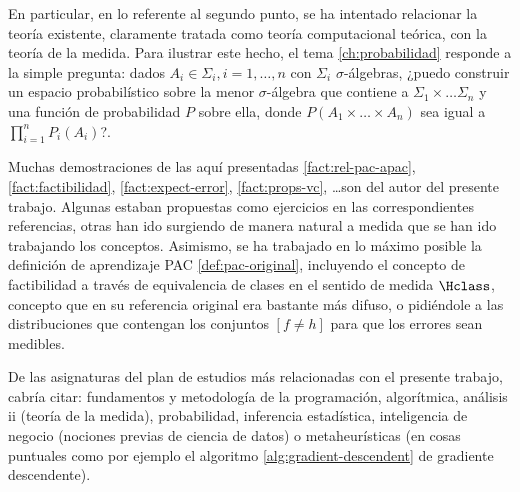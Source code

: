 En particular, en lo referente al segundo punto, se ha intentado relacionar la teoría existente, claramente tratada como 
teoría computacional teórica, con la teoría de la medida. Para ilustrar este hecho, el tema \ref{ch:probabilidad} responde a la 
simple pregunta: dados $A_i \in \Sigma_i, i=1, \ldots, n$ con $\Sigma_i$ $\sigma$-álgebras, ¿puedo construir un espacio probabilístico
sobre la menor $\sigma$-álgebra que contiene a $\Sigma_1 \times \ldots \Sigma_n$ y una función de probabilidad $P$ sobre ella,
donde $P(A_1 \times \ldots \times A_n)$ sea igual a $\prod_{i=1}^n P_i(A_i)$?. 

Muchas demostraciones de las aquí presentadas \ref{fact:rel-pac-apac}, \ref{fact:factibilidad}, \ref{fact:expect-error},
\ref{fact:props-vc}, \ldots son del autor del presente trabajo. Algunas estaban propuestas como ejercicios en las
correspondientes referencias, otras han ido surgiendo de manera natural a medida que se han ido trabajando los conceptos. 
Asimismo, se ha trabajado en lo máximo posible la definición de aprendizaje PAC \ref{def:pac-original},
incluyendo el concepto de factibilidad a través de equivalencia de clases en el sentido de medida $\Hclass$, concepto que en su
referencia original era bastante más difuso, o pidiéndole a las distribuciones que contengan los conjuntos $[f\neq h]$ para
que los errores sean medibles.

De las asignaturas del plan de estudios más relacionadas con el presente trabajo, cabría citar: fundamentos y metodología
de la programación, algorítmica, análisis ii (teoría de la medida), probabilidad, inferencia estadística, inteligencia
de negocio (nociones previas de ciencia de datos) o metaheurísticas (en cosas puntuales como por ejemplo el algoritmo 
\ref{alg:gradient-descendent} de gradiente descendente).
